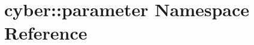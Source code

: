 \hypertarget{namespacecyber_1_1parameter}{\section{cyber\-:\-:parameter Namespace Reference}
\label{namespacecyber_1_1parameter}
}
